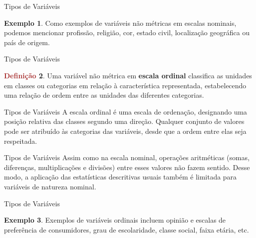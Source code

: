 \documentclass[10pt]{beamer}
\renewcommand{\indent}{\hspace*{2em}}
\theoremstyle{definition}
\newtheorem{defn}{\textcolor{brown}{Definição}}[section]
\newtheorem{ex}[defn]{\textcolor{strpink}{Exemplo}}
\begin{document}
\begin{frame}{Tipos de Variáveis}
\begin{ex}
\vfill\indent Como exemplos de variáveis não métricas em escalas nominais, podemos mencionar profissão, religião, cor, estado civil, localização geográfica ou país de origem.
\end{ex}
\end{frame}

\begin{frame}{Tipos de Variáveis}
\begin{defn}
\vfill\indent Uma variável não métrica em \textbf{escala ordinal} classifica as unidades em classes ou categorias em relação à característica representada, estabelecendo uma relação de ordem entre as unidades das diferentes categorias.
\end{defn}
\end{frame}

\begin{frame}{Tipos de Variáveis}
\indent  A escala ordinal é uma escala de ordenação, designando uma posição relativa das classes segundo uma direção. Qualquer conjunto de valores pode ser atribuído às categorias das variáveis, desde que a ordem entre elas seja respeitada.
\end{frame}

\begin{frame}{Tipos de Variáveis}
\indent Assim como na escala nominal, operações aritméticas (somas, diferenças, multiplicações e divisões) entre esses valores não fazem sentido. Desse modo, a aplicação das estatísticas descritivas usuais também é limitada para variáveis de natureza nominal. 
\end{frame}


\begin{frame}{Tipos de Variáveis}
\begin{ex}
\vfill\indent Exemplos de variáveis ordinais incluem opinião e escalas de preferência de consumidores, grau de escolaridade, classe social, faixa etária, etc.
\end{ex}
\end{frame}
\end{document}
